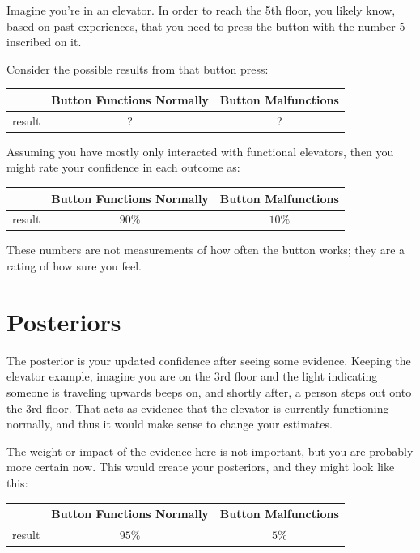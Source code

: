 \documentclass[
  letterpaper,
  DIV=11,
  numbers=noendperiod]{scrreprt}
\newcounter{none} %
\theoremstyle{remark}
\begin{document}
Imagine you're in an elevator. In order to reach the 5th floor, you
likely know, based on past experiences, that you need to press the
button with the number 5 inscribed on it.

Consider the possible results from that button press:

{\def\LTcaptype{none} %
\begin{longtable}[]{@{}lcc@{}}
\toprule\noalign{}
& Button Functions Normally & Button Malfunctions \\
\midrule\noalign{}
\endhead
\bottomrule\noalign{}
\endlastfoot
result & ? & ? \\
\end{longtable}
}

Assuming you have mostly only interacted with functional elevators, then
you might rate your confidence in each outcome as:

{\def\LTcaptype{none} %
\begin{longtable}[]{@{}lcc@{}}
\toprule\noalign{}
& Button Functions Normally & Button Malfunctions \\
\midrule\noalign{}
\endhead
\bottomrule\noalign{}
\endlastfoot
result & \(90\%\) & \(10\%\) \\
\end{longtable}
}

These numbers are not measurements of how often the button works; they
are a rating of how sure you feel.

\section{Posteriors}\label{posteriors}

The posterior is your updated confidence after seeing some evidence.
Keeping the elevator example, imagine you are on the 3rd floor and the
light indicating someone is traveling upwards beeps on, and shortly
after, a person steps out onto the 3rd floor. That acts as evidence that
the elevator is currently functioning normally, and thus it would make
sense to change your estimates.

The weight or impact of the evidence here is not important, but you are
probably more certain now. This would create your posteriors, and they
might look like this:

{\def\LTcaptype{none} %
\begin{longtable}[]{@{}lcc@{}}
\toprule\noalign{}
& Button Functions Normally & Button Malfunctions \\
\midrule\noalign{}
\endhead
\bottomrule\noalign{}
\endlastfoot
result & \(95\%\) & \(5\%\) \\
\end{longtable}
}
\end{document}
